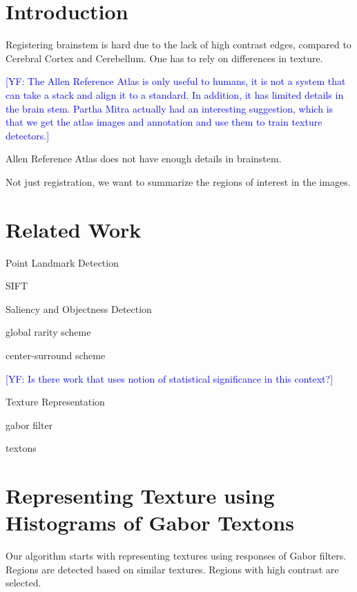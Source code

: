 \documentclass{llncs}
\newcommand{\authcmt}[2]{\textcolor{#1}{#2}}
\newcommand{\yoav}[1]{\authcmt{blue}{[YF: #1]}}
\begin{document}
\section{Introduction}
%

Registering brainstem is hard due to the lack of high contrast edges,
compared to Cerebral Cortex and Cerebellum. One has to rely on
differences in texture.

\yoav{The Allen Reference Atlas is only useful to humans, it is not a
  system that can take a stack and align it to a standard. In
  addition, it has limited details in the brain stem. Partha Mitra
  actually had an interesting suggestion, which is that we get the
  atlas images and annotation and use them to train texture
  detectors.}

Allen Reference Atlas does not have enough details in brainstem.


Not just registration, we want to summarize the regions of interest in the images.


\section{Related Work}

\begin{description}

\item{Point Landmark Detection}

SIFT

\item{Saliency and Objectness Detection}

global rarity scheme

center-surround scheme

\yoav{Is there work that uses notion of statistical significance in
  this context?}

\item{Texture Representation}

gabor filter

textons

\end{description}

\section{Representing Texture using Histograms of Gabor Textons}

Our algorithm starts with representing textures using responses of Gabor filters. Regions are detected based on similar textures. Regions with high contrast are selected. 
\end{document}
